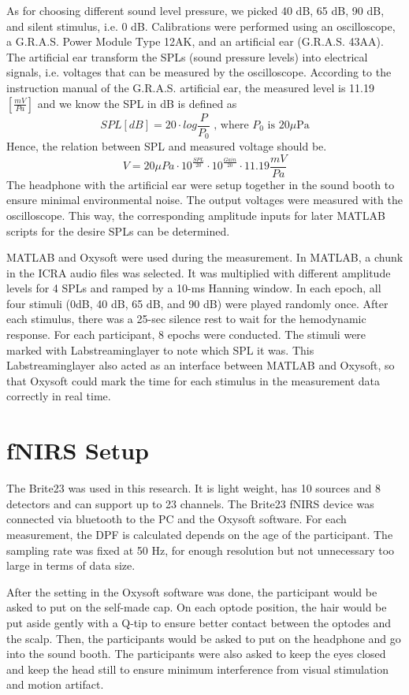 As for choosing different sound level pressure, we picked 40 dB, 65 dB, 90 dB, and silent stimulus, i.e. 0 dB. Calibrations were performed using an oscilloscope, a G.R.A.S. Power Module Type 12AK,  and an artificial ear (G.R.A.S. 43AA). The artificial ear transform the SPLs (sound pressure levels) into electrical signals, i.e. voltages that can be measured by the oscilloscope. According to the instruction manual of the G.R.A.S. artificial ear, the measured level is 11.19 $[ \frac {mV}{Pa}]$ and we know the SPL in dB is defined as 
\[
SPL [dB] = 20 \cdot log \frac{P}{P_0} \text{ , where $P_0$ is $20 \mu$Pa}
\] 
Hence, the relation between SPL and measured voltage should be.
\[
V = 20{ \mu Pa} \cdot 10^{\frac {SPL}{20}}  \cdot 10^{\frac{Gain}{20}} \cdot 11.19 {\frac {mV}{Pa}} 
\]
The headphone with the artificial ear were setup together in the sound booth to ensure minimal environmental noise. The output voltages were measured with the oscilloscope. This way, the corresponding amplitude inputs for later MATLAB scripts for the desire SPLs can be determined.

MATLAB and Oxysoft were used during the measurement. In MATLAB, a chunk in the ICRA audio files was selected. It was multiplied with different amplitude levels for 4 SPLs and ramped by a 10-ms Hanning window. In each epoch, all four stimuli (0dB, 40 dB, 65 dB, and 90 dB) were played randomly once. After each stimulus, there was a 25-sec silence rest to wait for the hemodynamic response. For each participant, 8 epochs were conducted. The stimuli were marked with Labstreaminglayer to note which SPL it was. This Labstreaminglayer also acted as an interface between MATLAB and Oxysoft, so that Oxysoft could mark the time for each stimulus in the measurement data correctly in real time.

\section {fNIRS Setup}
The Brite23 was used in this research. It is light weight, has 10 sources and 8 detectors and can support up to 23 channels. The Brite23 fNIRS device was connected via bluetooth to the PC and the Oxysoft software. For each measurement, the DPF is calculated depends on the age of the participant. The sampling rate was fixed at 50 Hz, for enough resolution but not unnecessary too large in terms of data size.

After the setting in the Oxysoft software was done, the participant would be asked to put on the self-made cap. On each optode position, the hair would be put aside gently with a Q-tip to ensure better contact between the optodes and the scalp. Then, the participants would be asked to put on the headphone and go into the sound booth. The participants were also asked to keep the eyes closed and keep the head still to ensure minimum interference from visual stimulation and motion artifact.


